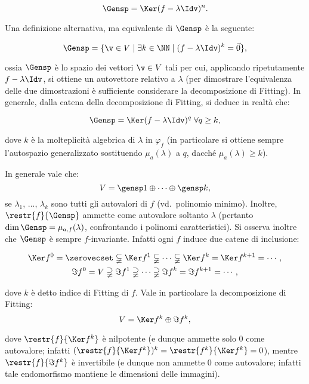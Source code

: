 \documentclass[10pt,landscape]{article}
\begin{document}
\begin{multicols}{3}
		\[ \Gensp = \Ker (f - \lambda \Idv)^n. \]
		
		Una definizione alternativa, ma equivalente di $\Gensp$ è la seguente:
		
		\[ \Gensp = \{ \v \in V \mid \exists k \in \NN \mid (f-\lambda \Idv)^k = \vec 0 \}, \]
		
		ossia $\Gensp$ è lo spazio dei vettori $\v \in V$ tali per cui, applicando ripetutamente $f-\lambda \Idv$, si ottiene un autovettore relativo a $\lambda$ (per
		dimostrare l'equivalenza delle due dimostrazioni è sufficiente considerare la
		decomposizione di Fitting). In generale, dalla catena della decomposizione
		di Fitting, si deduce in realtà che:
		
		\[ \Gensp = \Ker (f - \lambda \Idv)^q \; \forall q \geq k, \]
		
		dove $k$ è la molteplicità algebrica di $\lambda$ in $\varphi_f$ (in particolare
		si ottiene sempre l'autospazio generalizzato sostituendo $\mu_a(\lambda)$ a $q$,
		dacché $\mu_a(\lambda) \geq k$).
		
		In generale vale che:
		\[ V = \gensp 1 \oplus \cdots \oplus \gensp k, \]
		se $\lambda_1$, ..., $\lambda_k$ sono tutti gli autovalori di $f$ (vd.~polinomio minimo). Inoltre, $\restr{f}{\Gensp}$ ammette come autovalore soltanto $\lambda$
		(pertanto $\dim \Gensp = \mu_{a, f}(\lambda)$, confrontando i polinomi caratteristici). Si osserva inoltre che $\Gensp$ è sempre $f$-invariante. Infatti ogni $f$ induce due catene di inclusione:
		
		\begin{gather*}
			\Ker f^0 = \zerovecset \subsetneqq \Ker f^1 \subsetneqq \cdots \subsetneqq \Ker f^k = \Ker f^{k+1} = \cdots, \\
			\Im f^0 = V \supsetneqq \Im f^1 \supsetneqq \cdots \supsetneqq \Im f^k = \Im f^{k+1} = \cdots,
		\end{gather*}
		
		dove $k$ è detto indice di Fitting di $f$. Vale in particolare la decomposizione di Fitting:
		\[ V = \Ker f^k \oplus \Im f^k, \]
		
		dove $\restr{f}{\Ker f^k}$ è nilpotente (e dunque ammette solo $0$ come autovalore;
		infatti $(\restr{f}{\Ker f^k})^k = \restr{f^k}{\Ker f^k} = 0$),
		mentre $\restr{f}{\Im f^k}$ è invertibile (e dunque non ammette $0$ come autovalore;
		infatti tale endomorfismo mantiene le dimensioni delle immagini).
		

\end{multicols}
\end{document}
